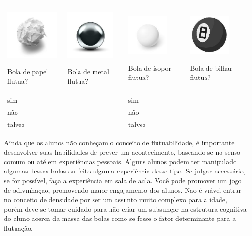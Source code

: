 \begin{longtable}[]{@{}llll@{}}
\toprule
\begin{minipage}[t]{0.24\columnwidth}\raggedright\strut
\includegraphics[width=1.06165in,height=0.99037in]{media/image88.jpg}

Bola de papel flutua?\strut
\end{minipage} & \begin{minipage}[t]{0.24\columnwidth}\raggedright\strut
\includegraphics[width=0.98125in,height=0.98125in]{media/image89.jpg}

Bola de metal flutua?\strut
\end{minipage} & \begin{minipage}[t]{0.24\columnwidth}\raggedright\strut
\includegraphics[width=0.83333in,height=0.83333in]{media/image90.jpg}

Bola de isopor flutua?\strut
\end{minipage} & \begin{minipage}[t]{0.24\columnwidth}\raggedright\strut
\includegraphics[width=0.83333in,height=0.83333in]{media/image91.jpg}

Bola de bilhar flutua?\strut
\end{minipage}\tabularnewline
sim & & sim &\tabularnewline
não & & não &\tabularnewline
talvez & & talvez &\tabularnewline
\bottomrule
\end{longtable}

Ainda que os alunos não conheçam o
conceito de flutuabilidade, é importante
desenvolver suas habilidades de prever um acontecimento, baseando-se no
senso comum ou até em experiências pessoais. Alguns alunos podem ter
manipulado algumas dessas bolas ou feito alguma experiência
desse tipo. Se julgar necessário, se for possível, faça a experiência em
sala de aula. Você pode promover um jogo de adivinhação, promovendo
maior engajamento dos alunos. Não é viável entrar no conceito de
densidade por ser um assunto muito complexo para a idade, porém deve-se
tomar cuidado para não criar um subsunçor na estrutura cognitiva do
aluno acerca da massa das bolas como se fosse o fator determinante para a
flutuação.

